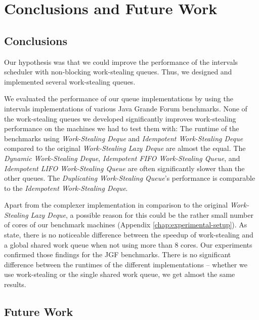 
\chapter{Conclusions and Future Work}
\label{chap:queues-conclusions-and-future-work}

\section{Conclusions}
\label{sec:queues-conclusions-and-future-work-conclusions}

Our hypothesis was that we could improve the performance of the
intervals scheduler with non-blocking work-stealing queues. Thus, we
designed and implemented several work-stealing queues.

We evaluated the performance of our queue implementations by using the
intervals implementations of various Java Grande Forum
benchmarks. None of the work-stealing queues we developed
significantly improves work-stealing performance on the machines we
had to test them with: The runtime of the benchmarks using
\emph{Work-Stealing Deque} and \emph{Idempotent Work-Stealing Deque}
compared to the original \emph{Work-Stealing Lazy Deque} are almost
the equal. The \emph{Dynamic Work-Stealing Deque}, \emph{Idempotent
  FIFO Work-Stealing Queue}, and \emph{Idempotent LIFO Work-Stealing
  Queue} are often significantly slower than the other queues. The
\emph{Duplicating Work-Stealing Queue}'s performance is comparable to
the \emph{Idempotent Work-Stealing Deque}.

Apart from the complexer implementation in comparison to the original
\emph{Work-Stealing Lazy Deque}, a possible reason for this could be
the rather small number of cores of our benchmark machines (Appendix
\ref{chap:experimental-setup}). As \textcite{Saha2007} state, there is
no noticeable difference between the speedup of work-stealing and a
global shared work queue when not using more than 8 cores. Our
experiments confirmed those findings for the JGF benchmarks. There is
no significant difference between the runtimes of the different
implementations -- whether we use work-stealing or the single shared
work queue, we get almost the same results.


\section{Future Work}
\label{sec:queues-conclusions-and-future-work-future-work}

